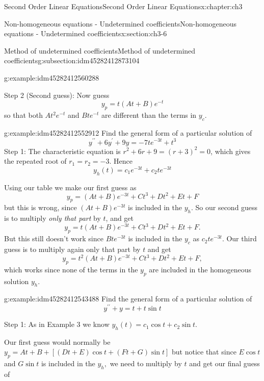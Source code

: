 \documentclass[oneside,10pt,]{book}
\numberwithin{equation}{section}
\numberwithin{equation}{section}
\begin{document}
\begin{chapterptx}{Second Order Linear Equations}{}{Second Order Linear Equations}{}{}{x:chapter:ch3}
\begin{sectionptx}{Non-homogeneous equations - Undetermined coefficients}{}{Non-homogeneous equations - Undetermined coefficients}{}{}{x:section:ch3-6}
\begin{subsectionptx}{Method of undetermined coefficients}{}{Method of undetermined coefficients}{}{}{g:subsection:idm45282412873104}
\begin{example}{}{g:example:idm45282412560288}
\par
Step 2 (Second guess): Now guess%
\begin{equation*}
y_{p}=t\left(At+B\right)e^{-t}
\end{equation*}
so that both \(At^{2}e^{-t}\) and \(Bte^{-t}\) are different than the terms in \(y_{c}\).%
\end{example}
\begin{example}{}{g:example:idm45282412552912}%
Find the general form of a particular solution of%
\begin{equation*}
y^{\prime\prime}+6y^{\prime}+9y=-7te^{-3t}+t^{3}
\end{equation*}
Step 1: The characteristic equation is \(r^{2}+6r+9=(r+3)^{2}=0\), which gives the repeated root of \(r_{1}=r_{2}=-3\). Hence%
\begin{equation*}
y_{h}(t)=c_{1}e^{-3t}+c_{2}te^{-3t}
\end{equation*}
%
\par
Using our table we make our first guess as%
\begin{equation*}
y_{p}=\left(At+B\right)e^{-3t}+Ct^{3}+Dt^{2}+Et+F
\end{equation*}
but this is wrong, since \(\left(At+B\right)e^{-3t}\) is included in the \(y_{h}\). So our second guess is to multiply \emph{only that part} by \(t\), and get%
\begin{equation*}
y_{p}=t\left(At+B\right)e^{-3t}+Ct^{3}+Dt^{2}+Et+F.
\end{equation*}
But this still doesn't work since \(Bte^{-3t}\) is included in the \(y_{c}\) as \(c_{2}te^{-3t}\). Our third guess is to multiply again only that part by \(t\) and get%
\begin{equation*}
y_{p}=t^{2}\left(At+B\right)e^{-3t}+Ct^{3}+Dt^{2}+Et+F,
\end{equation*}
which works since none of the terms in the \(y_{p}\) are included in the homogeneous solution \(y_{h}\).%
\end{example}
\begin{example}{}{g:example:idm45282412543488}%
Find the general form of a particular solution of%
\begin{equation*}
y^{\prime\prime}+y=t+t\sin t
\end{equation*}
%
\par
Step 1: As in Example 3 we know \(y_{h}(t)=c_{1}\cos t+c_{2}\sin t.\)%
\par
Our first guess would normally be \(y_{p}=At+B+\left[\left(Dt+E\right)\cos t+\left(Ft+G\right)\sin t\right]\) but notice that since \(E\cos t\) and \(G\sin t\) is included in the \(y_{h},\) we need to multiply by \(t\) and get our final guess of%

\end{example}
\end{subsectionptx}
\end{sectionptx}
\end{chapterptx}
\end{document}
